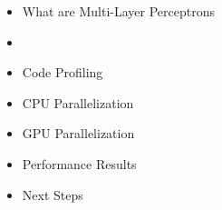 \begin{frame}
\begin{itemize}
    \item What are Multi-Layer Perceptrons
    \item \textbf{\color{red}{Gradient Descent}}
    \item Code Profiling
    \item CPU Parallelization
    \item GPU Parallelization
    \item Performance Results 
    \item Next Steps
\end{itemize}
\end{frame}


